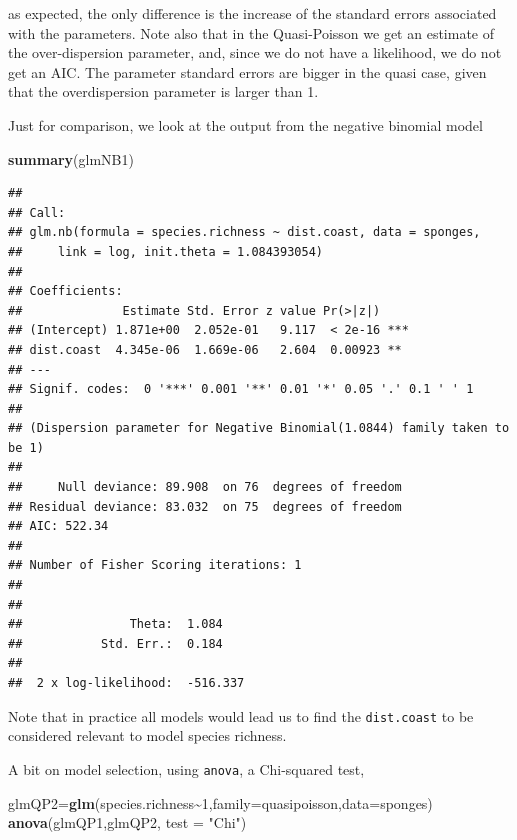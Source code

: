 \documentclass[
]{book}
\newenvironment{Shaded}{\begin{snugshade}}{\end{snugshade}}
\newcommand{\AttributeTok}[1]{\textcolor[rgb]{0.13,0.29,0.53}{#1}}
\newcommand{\DecValTok}[1]{\textcolor[rgb]{0.00,0.00,0.81}{#1}}
\newcommand{\FunctionTok}[1]{\textcolor[rgb]{0.13,0.29,0.53}{\textbf{#1}}}
\newcommand{\NormalTok}[1]{#1}
\newcommand{\OtherTok}[1]{\textcolor[rgb]{0.56,0.35,0.01}{#1}}
\newcommand{\SpecialCharTok}[1]{\textcolor[rgb]{0.81,0.36,0.00}{\textbf{#1}}}
\newcommand{\StringTok}[1]{\textcolor[rgb]{0.31,0.60,0.02}{#1}}
\begin{document}
as expected, the only difference is the increase of the standard errors associated with the parameters. Note also that in the Quasi-Poisson we get an estimate of the over-dispersion parameter, and, since we do not have a likelihood, we do not get an AIC. The parameter standard errors are bigger in the quasi case, given that the overdispersion parameter is larger than 1.

Just for comparison, we look at the output from the negative binomial model

\begin{Shaded}
\begin{Highlighting}[]
\FunctionTok{summary}\NormalTok{(glmNB1)}
\end{Highlighting}
\end{Shaded}

\begin{verbatim}
## 
## Call:
## glm.nb(formula = species.richness ~ dist.coast, data = sponges, 
##     link = log, init.theta = 1.084393054)
## 
## Coefficients:
##              Estimate Std. Error z value Pr(>|z|)    
## (Intercept) 1.871e+00  2.052e-01   9.117  < 2e-16 ***
## dist.coast  4.345e-06  1.669e-06   2.604  0.00923 ** 
## ---
## Signif. codes:  0 '***' 0.001 '**' 0.01 '*' 0.05 '.' 0.1 ' ' 1
## 
## (Dispersion parameter for Negative Binomial(1.0844) family taken to be 1)
## 
##     Null deviance: 89.908  on 76  degrees of freedom
## Residual deviance: 83.032  on 75  degrees of freedom
## AIC: 522.34
## 
## Number of Fisher Scoring iterations: 1
## 
## 
##               Theta:  1.084 
##           Std. Err.:  0.184 
## 
##  2 x log-likelihood:  -516.337
\end{verbatim}

Note that in practice all models would lead us to find the \texttt{dist.coast} to be considered relevant to model species richness.

A bit on model selection, using \texttt{anova}, a Chi-squared test,

\begin{Shaded}
\begin{Highlighting}[]
\NormalTok{glmQP2}\OtherTok{=}\FunctionTok{glm}\NormalTok{(species.richness}\SpecialCharTok{\textasciitilde{}}\DecValTok{1}\NormalTok{,}\AttributeTok{family=}\NormalTok{quasipoisson,}\AttributeTok{data=}\NormalTok{sponges)}
\FunctionTok{anova}\NormalTok{(glmQP1,glmQP2, }\AttributeTok{test =} \StringTok{"Chi"}\NormalTok{)}
\end{Highlighting}
\end{Shaded}
\end{document}
